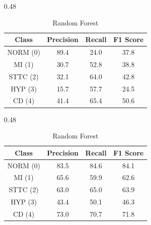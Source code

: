 \begin{table}[H]
    \centering
    \caption{\textbf{Protocol B} class–wise performance metrics across models.}
    \label{tab:cv_classwise_part2_ablation}

    \begin{subtable}[t]{0.48\textwidth}
        \centering
        \caption{KNN}
        \label{tab:cv_knn_part2_ablation}
        \begin{tabular}{cccc}
            \toprule
            Class & Precision & Recall & F1 Score \\
            \midrule
            NORM (0) & 89.4 & 24.0 & 37.8 \\
            MI   (1) & 30.7 & 52.8 & 38.8 \\
            STTC (2) & 32.1 & 64.0 & 42.8 \\
            HYP  (3) & 15.7 & 57.7 & 24.5 \\
            CD   (4) & 41.4 & 65.4 & 50.6 \\
            \bottomrule
        \end{tabular}
    \end{subtable}
    \hfill
    \begin{subtable}[t]{0.48\textwidth}
        \centering
        \caption{Random Forest}
        \label{tab:cv_rf_part2_ablation}
        \begin{tabular}{cccc}
            \toprule
            Class & Precision & Recall & F1 Score \\
            \midrule
            NORM (0) & 83.5 & 84.6 & 84.1 \\
            MI   (1) & 65.6 & 59.9 & 62.6 \\
            STTC (2) & 63.0 & 65.0 & 63.9 \\
            HYP  (3) & 43.4 & 50.1 & 46.3 \\
            CD   (4) & 73.0 & 70.7 & 71.8 \\
            \bottomrule
        \end{tabular}
    \end{subtable}

    \bigskip


\end{table}
